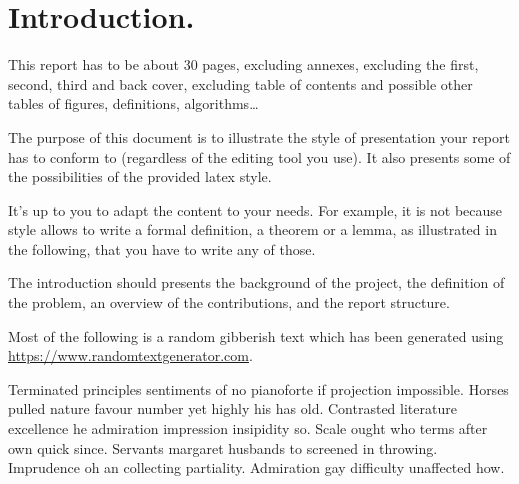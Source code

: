\documentclass[english,RandD,Confidential]{rapportPFE}  %
\begin{document}
\begin{ResumeMotsCles}
\end{ResumeMotsCles}








\setcounter{tocdepth}{3}
\tableofcontents
\cleardoublepage


\section{Introduction.}
This report has to be about 30 pages, excluding annexes, excluding the first, second, third and back cover, excluding table of contents and possible other tables of figures, definitions, algorithms\ldots

The purpose of this document is to illustrate the style of presentation your report has to conform to (regardless of the editing tool you use). It also presents some of the possibilities of the provided latex style. 

It's up to you to adapt the content to your needs. For example, it is not because style allows to write a formal definition, a theorem or a lemma, as illustrated in the following, that you have to write any of those.

The introduction should presents the background of the project, the definition of the problem, an overview of the contributions, and the report structure.

Most of the following is a random gibberish text  which has been generated using \url{https://www.randomtextgenerator.com}. 

Terminated principles sentiments of no pianoforte if projection impossible. Horses pulled nature favour number yet highly his has old. Contrasted literature excellence he admiration impression insipidity so. Scale ought who terms after own quick since. Servants margaret husbands to screened in throwing. Imprudence oh an collecting partiality. Admiration gay difficulty unaffected how. 
\end{document}
